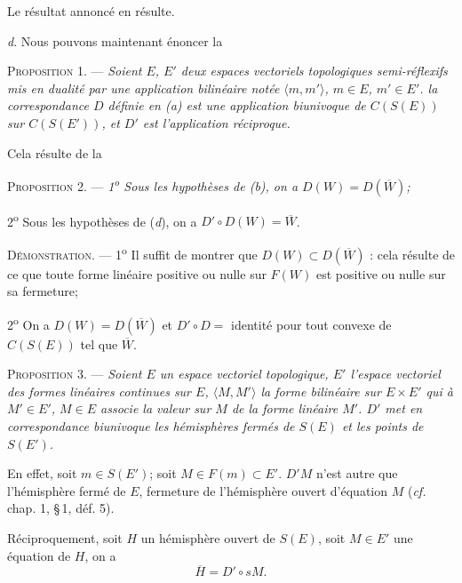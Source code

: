 \documentclass[11pt]{article}
\newcommand{\bzcf}[2]{#1}
\newenvironment{prop}[1][]{\par\medskip\noindent\textsc{Proposition #1.} --- \itshape}{\par\medskip}
\newenvironment{proof}[1][]{\par}{\par}
\begin{document}
Le résultat annoncé en résulte.

\textit{d}. Nous pouvons maintenant énoncer la

\begin{prop}[1]
Soient $E$, $E'$ deux espaces vectoriels topologiques semi-réflexifs mis en dualité par une
application bilinéaire notée $\langle m, m'\rangle$, $m\in E$, $m'\in E'$. la correspondance $D$
définie en (\textit{a}) est une application biunivoque de $C(S(E))$ sur $C(S(E'))$, et $D'$ est
l'application réciproque.
\end{prop}

\begin{proof}
Cela résulte de la
\end{proof}

\begin{prop}[2]
1\textsuperscript{o} Sous les hypothèses de (\textit{b}), on a $D(W)=D(\overline{W})$;

2\textsuperscript{o} Sous les hypothèses de (\textit{d}), on a $D'\circ D(W)=\overline{W}$.
\end{prop}

\begin{proof}
\textsc{Démonstration.} --- 1\textsuperscript{o} Il suffit de montrer que
$D(W)\subset D(\overline{W})$ : cela résulte de ce que toute forme linéaire positive ou nulle sur
$F(W)$ est positive ou nulle sur sa fermeture;

2\textsuperscript{o} On a $D(W)=D(\overline{W})$ et $D'\circ D=$ identité pour tout convexe de
$C(S(E))$ tel que $\overline{W}$.
\end{proof}

\begin{prop}[3]
Soient $E$ un espace vectoriel topologique, $E'$ l'espace vectoriel des formes linéaires
continues sur $E$, $\langle M, M'\rangle$ la forme bilinéaire sur $E\times E'$ qui à $M'\in E'$,
$M\in E$ associe la valeur sur $M$ de la forme linéaire $M'$. $D'$ met en correspondance
biunivoque les hémisphères fermés de $S(E)$ et les points de $S(E')$.
\end{prop}

\begin{proof}
En effet, soit $m\in S(E')$; soit $M\in F(m)\subset E'$. $D'M$ n'est autre que l'hémisphère fermé
de $E$, fermeture de l'hémisphère ouvert d'équation $M$ (\bzcf{\textit{cf.} chap. 1, \S\,1,
déf. 5}{\ref{bzdef:c1s1d5_hemisphere}}).

Réciproquement, soit $H$ un hémisphère ouvert de $S(E)$, soit $M\in E'$ une équation de $H$, on a
\[ \overline{H}=D'\circ sM. \]
\end{proof}
\end{document}
